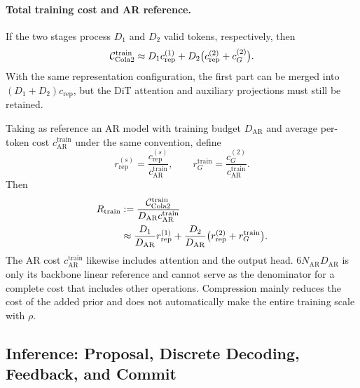 \paragraph{Total training cost and AR reference.}
If the two stages process $D_1$ and $D_2$ valid tokens, respectively, then
\begin{equation}
    \mathcal C_{\text{Cola2}}^{\mathrm{train}}
    \approx D_1c_{\mathrm{rep}}^{(1)}
           +D_2\big(c_{\mathrm{rep}}^{(2)}+c_G^{(2)}\big).
    \label{eq:app-cost-total-train}
\end{equation}
With the same representation configuration, the first part can be merged into $(D_1+D_2)c_{\mathrm{rep}}$, but the DiT attention and auxiliary projections must still be retained.

Taking as reference an AR model with training budget $D_{\mathrm{AR}}$ and average per-token cost $c_{\mathrm{AR}}^{\mathrm{train}}$ under the same convention, define
\begin{equation}
    r_{\mathrm{rep}}^{(s)}
    =\frac{c_{\mathrm{rep}}^{(s)}}{c_{\mathrm{AR}}^{\mathrm{train}}},
    \qquad
    r_G^{\mathrm{train}}
    =\frac{c_G^{(2)}}{c_{\mathrm{AR}}^{\mathrm{train}}}.
    \label{eq:app-cost-train-normalized}
\end{equation}
Then
\begin{equation}
\begin{aligned}
    R_{\mathrm{train}}
    &:=\frac{\mathcal C_{\text{Cola2}}^{\mathrm{train}}}
             {D_{\mathrm{AR}}c_{\mathrm{AR}}^{\mathrm{train}}}\\
    &\approx\frac{D_1}{D_{\mathrm{AR}}}r_{\mathrm{rep}}^{(1)}
      +\frac{D_2}{D_{\mathrm{AR}}}
       \big(r_{\mathrm{rep}}^{(2)}+r_G^{\mathrm{train}}\big).
\end{aligned}
\label{eq:app-cost-train-ratio}
\end{equation}
The AR cost $c_{\mathrm{AR}}^{\mathrm{train}}$ likewise includes attention and the output head. $6N_{\mathrm{AR}}D_{\mathrm{AR}}$ is only its backbone linear reference and cannot serve as the denominator for a complete cost that includes other operations. Compression mainly reduces the cost of the added prior and does not automatically make the entire training scale with $\rho$.

\subsection{Inference: Proposal, Discrete Decoding, Feedback, and Commit}

